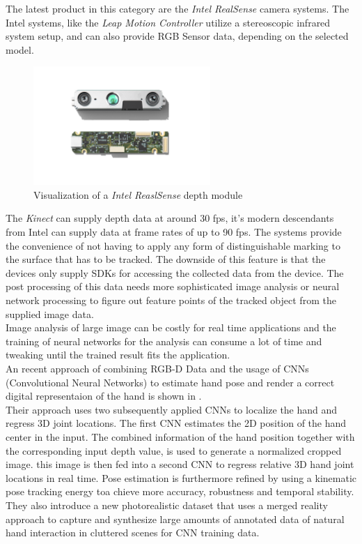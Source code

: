 The latest product in this category are the \textit{Intel RealSense} camera systems\cite{IntelCorporation.2018}. The Intel systems, like the\textit{ Leap Motion Controller} utilize a stereoscopic infrared system setup, and can also provide RGB Sensor data, depending on the selected model.
\begin{figure}[H]
\centering
\includegraphics[width=0.6\textwidth]{images/RealSense.png}
\caption{Visualization of a \textit{Intel ReaslSense} depth module\cite{IntelCorporation.2018}}
\label{img:realsense} 
\end{figure}
The \textit{Kinect} can supply depth data at around 30 fps, it's modern  descendants from Intel can supply data at frame rates of up to 90 fps. The systems provide the convenience of not having to apply any form of distinguishable marking to the surface that has to be tracked. The downside of this feature is that the devices only supply SDKs for accessing the collected data from the device. The post processing of this data needs more sophisticated image analysis or neural network processing to figure out feature points of the tracked object from the supplied image data\cite{JamieShotton.2011,Oikonomidis.2011b}.\\Image analysis of large image can be costly for real time applications and the training of neural networks for the analysis can consume a lot of time and tweaking until the trained result fits the application.
\\An recent approach of combining RGB-D Data and the usage of CNNs (Convolutional Neural Networks) to estimate hand pose and render a correct digital representaion of the hand is shown in \cite{FranziskaMueller.2017}.
\\Their approach uses two subsequently applied CNNs to localize the hand and regress 3D joint locations. The first CNN estimates the 2D position of the hand center in the input. The combined information of the hand position together with the corresponding input depth value, is used to generate a normalized cropped image. this image is then fed into a second CNN to regress relative 3D hand joint
locations in real time. Pose estimation is furthermore refined by using a kinematic pose tracking energy toa chieve more accuracy, robustness and
temporal stability.
\\They also introduce a new photorealistic dataset that uses a merged reality
approach to capture and synthesize large amounts of annotated
data of natural hand interaction in cluttered scenes for CNN training data.






